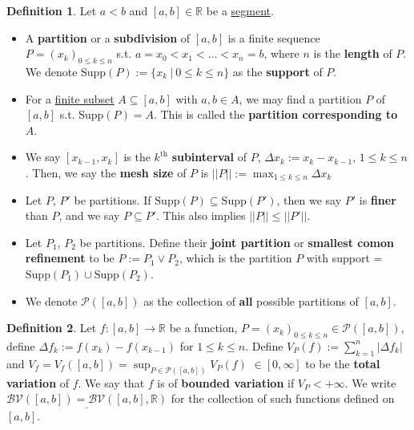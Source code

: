 \documentclass[12pt,a4paper]{article}
\theoremstyle{definition}
\newtheorem{definition}{Definition}[subsection]
\begin{document}
\begin{definition}
  Let $a < b$ and $[a, b] \in \mathbb{R}$ be a \underline{segment}.
  \begin{itemize}
    \item A \textbf{partition} or a \textbf{subdivision} of $[a, b]$ is a finite sequence $P = (x_k)_{0 \leq k \leq n}$ s.t. $a = x_0 < x_1 < \dots < x_n = b$, where $n$ is the \textbf{length} of $P$. We denote \underline{$\text{Supp}(P):=\{x_k\ |\ 0 \leq k \leq n\}$} as the \textbf{support} of $P$.
    \item For a \underline{finite subset} $A \subseteq [a, b]$ with $a, b \in A$, we may find a partition $P$ of $[a, b]$ s.t. Supp$(P) = A$. This is called the \textbf{partition corresponding to $A$}.
    \item We say $[x_{k -  1}, x_k]$ is the $k^{\text{th}}$ \textbf{subinterval} of $P$, \underline{$\Delta x_k := x_k - x_{k - 1}$}, $1 \leq k \leq n$. Then, we say the \textbf{mesh size} of $P$ is \underline{$||P|| := \max_{1 \leq k \leq n} \Delta x_k$}
    \item Let $P$, $P'$ be partitions. If $\text{Supp}(P) \subseteq \text{Supp}(P')$, then we say $P'$ is \textbf{finer} than $P$, and we say \underline{$P \subseteq P'$}. This also implies \underline{$||P|| \leq ||P'||$}.
    \item Let $P_1$, $P_2$ be partitions. Define their \textbf{joint partition} or \textbf{smallest comon refinement} to be \underline{$P := P_1 \vee P_2$}, which is the partition $P$ with support = \underline{$\text{Supp}(P_1) \cup \text{Supp}(P_2)$}.
    \item We denote \underline{$\mathcal{P}([a, b])$} as the collection of \textbf{all} possible partitions of $[a, b]$.
  \end{itemize}
\end{definition}
\vspace{0.125em}

\begin{definition}
  Let $f: [a, b] \rightarrow \mathbb{R}$ be a function, $P = (x_k)_{0 \leq k \leq n} \in \mathcal{P}([a, b])$, define \underline{$\Delta f_k := f(x_k) - f(x_{k - 1})$} for $1 \leq k \leq n$. Define \underline{$V_P(f) := \sum_{k = 1}^{n} |\Delta f_k|$} and \underline{$V_f = V_f([a, b]) = \sup_{P \in \mathcal{P}([a, b])} V_P(f)$} $\in [0, \infty]$ to be the \textbf{total variation} of $f$. We say that $f$ is of \textbf{bounded variation} if $V_P < +\infty$. We write $\underline{\mathcal{BV}([a, b]) = \mathcal{BV}([a, b], \mathbb{R})}$ for the collection of such functions defined on $[a, b]$.
\end{definition}
\vspace{0.125em}
\end{document}
